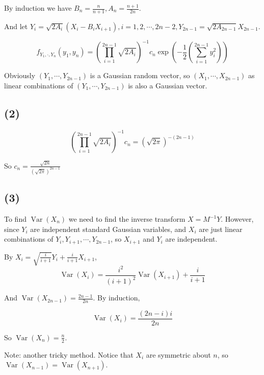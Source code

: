 \documentclass{article}
\begin{document}
By induction we have $B_n = \frac{n}{n+1},A_n = \frac{n+1}{2n}$. 

And let $Y_i = \sqrt{2A_i} ( X_i-B_i X_{i+1}),i=1,2,\cdots,2n-2,Y_{2n-1} = \sqrt{2A_{2n-1}} X_{2n-1} $. 

\begin{equation}
    f_{Y_1,\cdot,Y_n}(y_1,y_n) =\left(\prod_{i=1}^{2n-1} \sqrt{2A_i} \right)^{-1}c_n \exp\left(-\frac{1}{2}\left(\sum_{i=1}^{2n-1} y_i^2\right)\right)
\end{equation}

Obviously $(Y_1,\cdots,Y_{2n-1})$ is a Gaussian random vector, so $(X_1,\cdots,X_{2n-1})$ as linear combinations of $(Y_1,\cdots,Y_{2n-1})$ is also a Gaussian vector.

\subsection{(2)}


\begin{equation}
    \left(\prod_{i=1}^{2n-1} \sqrt{2A_i} \right)^{-1}c_n  = (\sqrt{2\pi})^{-(2n-1)}
\end{equation}

So $c_n = \frac{\sqrt{2n}}{(\sqrt{2\pi})^{2n-1}}$

\subsection{(3)}

To find $\operatorname{Var}(X_n)$ we need to find the inverse transform $X= M^{-1}Y$. 
However, since $Y_i$ are independent standard Gaussian variables, and $X_i $ are just linear combinations of $Y_i,Y_{i+1},\cdots, Y_{2n-1}$, so $X_{i+1}$ and $Y_i$ are independent.

By $X_i = \sqrt{\frac{i}{i+1}} Y_i + \frac{i}{i+1} X_{i+1}$,
\begin{equation}
    \operatorname{Var}(X_i) = \frac{i^2}{(i+1)^2}  \operatorname{Var}(X_{i+1}) + \frac{i}{i+1}
\end{equation}

And $\operatorname{Var}(X_{2n-1})  = \frac{2n-1}{2n}$. By induction,

\begin{equation}
    \operatorname{Var}(X_{i})  = \frac{(2n-i)i}{2n}
\end{equation}

So $\operatorname{Var}(X_{n}) = \frac{n}{2}$.

Note: another tricky method. Notice that $X_i$ are symmetric about $n$, so $\operatorname{Var}(X_{n-1}) = \operatorname{Var}(X_{n+1})$.
\end{document}

